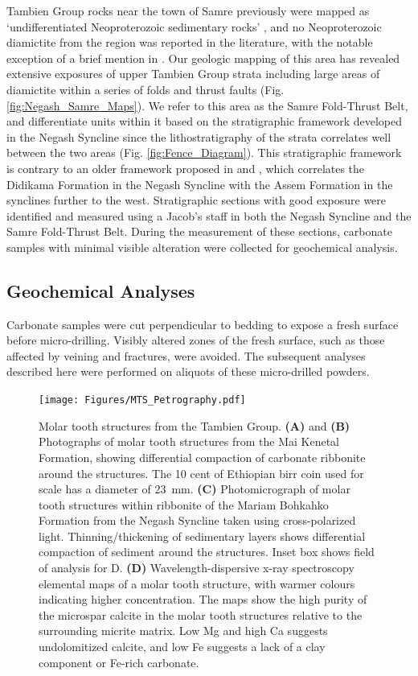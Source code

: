 \documentclass[11pt,letterpaper]{article}
\begin{document}
Tambien Group rocks near the town of Samre previously were mapped as `undifferentiated Neoproterozoic sedimentary rocks' \citep{Arkin1971a}, and no Neoproterozoic diamictite from the region was reported in the literature, with the notable exception of a brief mention in \citet{Bussert2010a}. Our geologic mapping of this area has revealed extensive exposures of upper Tambien Group strata including large areas of diamictite within a series of folds and thrust faults (Fig. \ref{fig:Negash_Samre_Maps}). We refer to this area as the Samre Fold-Thrust Belt, and differentiate units within it based on the stratigraphic framework developed in the Negash Syncline \citep{Swanson-Hysell2015a} since the lithostratigraphy of the strata correlates well between the two areas (Fig. \ref{fig:Fence_Diagram}). This stratigraphic framework is contrary to an older framework proposed in \citet{Alene2006a} and \citet{Miller2009a}, which correlates the Didikama Formation in the Negash Syncline with the Assem Formation in the synclines further to the west. Stratigraphic sections with good exposure were identified and measured using a Jacob's staff in both the Negash Syncline and the Samre Fold-Thrust Belt. During the measurement of these sections, carbonate samples with minimal visible alteration were collected for geochemical analysis.

\subsection*{Geochemical Analyses \label{sec:GeochemicalAnalyses}}

Carbonate samples were cut perpendicular to bedding to expose a fresh surface before micro-drilling. Visibly altered zones of the fresh surface, such as those affected by veining and fractures, were avoided. The subsequent analyses described here were performed on aliquots of these micro-drilled powders.

\begin{figure}[h!]
\begin{center}
	\texttt{[image: Figures/MTS\_Petrography.pdf]}
	\caption{Molar tooth structures from the Tambien Group. \textbf{(A)} and \textbf{(B)} Photographs of molar tooth structures from the Mai Kenetal Formation, showing differential compaction of carbonate ribbonite around the structures. The 10 cent of Ethiopian birr coin used for scale has a diameter of 23~mm. \textbf{(C)} Photomicrograph of molar tooth structures within ribbonite of the Mariam Bohkahko Formation from the Negash Syncline taken using cross-polarized light. Thinning/thickening of sedimentary layers shows differential compaction of sediment around the structures. Inset box shows field of analysis for D. \textbf{(D)} Wavelength-dispersive x-ray spectroscopy elemental maps of a molar tooth structure, with warmer colours indicating higher concentration. The maps show the high purity of the microspar calcite in the molar tooth structures relative to the surrounding micrite matrix. Low Mg and high Ca suggests undolomitized calcite, and low Fe suggests a lack of a clay component or Fe-rich carbonate.}
	\label{fig:MTS_Petrography}
\end{center}
\end{figure}
\end{document}
